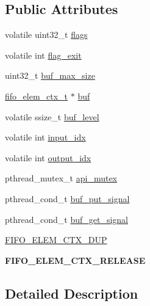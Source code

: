 \subsection*{Public Attributes}
\begin{DoxyCompactItemize}
\item 
volatile uint32\+\_\+t \hyperlink{structfifo__ctx__s_a6c86ce21bbd7a84d164d9c5ecf72ac3a}{flags}
\item 
volatile int \hyperlink{structfifo__ctx__s_a4856c98e4576bd328ff3ee4063b1421a}{flag\+\_\+exit}
\item 
uint32\+\_\+t \hyperlink{structfifo__ctx__s_ac2945108d1eec583f5cb70f1dcafa479}{buf\+\_\+max\+\_\+size}
\item 
\hyperlink{structfifo__elem__ctx__s}{fifo\+\_\+elem\+\_\+ctx\+\_\+t} $\ast$ \hyperlink{structfifo__ctx__s_a282d9421deabfcb2966d5134a6d76779}{buf}
\item 
volatile ssize\+\_\+t \hyperlink{structfifo__ctx__s_a9661ff316afd08e4eb0919cd02e355ce}{buf\+\_\+level}
\item 
volatile int \hyperlink{structfifo__ctx__s_aa5c17b3a497d655710243cb2c14ef1bf}{input\+\_\+idx}
\item 
volatile int \hyperlink{structfifo__ctx__s_a28fca425f183a3add55c94dcdc5c04e0}{output\+\_\+idx}
\item 
pthread\+\_\+mutex\+\_\+t \hyperlink{structfifo__ctx__s_a27be272ae3fa045dfb5e64778a484725}{api\+\_\+mutex}
\item 
pthread\+\_\+cond\+\_\+t \hyperlink{structfifo__ctx__s_a3f9e6f9e1505a9f7e1756c212602a9df}{buf\+\_\+put\+\_\+signal}
\item 
pthread\+\_\+cond\+\_\+t \hyperlink{structfifo__ctx__s_af13501e5f83d5d1561bf76577c490f23}{buf\+\_\+get\+\_\+signal}
\item 
\hyperlink{structfifo__ctx__s_a5733ada7a9bf525cdddf6d839a4eef03}{F\+I\+F\+O\+\_\+\+E\+L\+E\+M\+\_\+\+C\+T\+X\+\_\+\+D\+UP}
\item 
{\bfseries F\+I\+F\+O\+\_\+\+E\+L\+E\+M\+\_\+\+C\+T\+X\+\_\+\+R\+E\+L\+E\+A\+SE}\hypertarget{structfifo__ctx__s_a1c57706addad61c416527a3d4dee08a7}{}\label{structfifo__ctx__s_a1c57706addad61c416527a3d4dee08a7}

\end{DoxyCompactItemize}


\subsection{Detailed Description}


